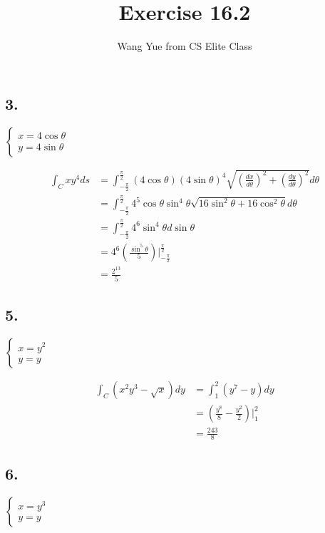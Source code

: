 \documentclass{article}
\begin{document}
  \title{Exercise 16.2}
  \author{Wang Yue from CS Elite Class}
  \maketitle

  \subsection*{3. }

  $\left\{ \begin{array}{ll}
    x = 4\cos \theta \\
    y = 4\sin \theta
  \end{array}\right.$

  $$\begin{aligned}
    \int_C xy^4 ds &= \int_{-\frac \pi 2}^{\frac \pi 2} (4\cos \theta)(4\sin \theta)^4 \sqrt{(\frac{dx}{d\theta})^2 + (\frac{dy}{d\theta})^2} d\theta \\
    &= \int_{-\frac \pi 2}^{\frac \pi 2} 4^5 \cos \theta \sin^4 \theta \sqrt{16\sin^2 \theta + 16\cos^2 \theta} d\theta  \\
    &= \int_{-\frac \pi 2}^{\frac \pi 2} 4^6 \sin^4 \theta d\sin \theta \\
    &= 4^6 (\frac{\sin^5 \theta}{5})\biggl|_{-\frac{\pi}{2}}^{\frac{\pi}{2}} \\
    &= \frac{2^{13}}{5}
  \end{aligned}$$

  \subsection*{5. }

  $\left\{ \begin{array}{ll}
    x = y^2 \\ y = y
  \end{array}\right.$

  $$\begin{aligned}
    \int_C (x^2y^3 - \sqrt x) dy &= \int_1^2 (y^7- y)dy \\
    &= (\frac{y^8}{8} - \frac{y^2}{2})\biggl|_1^2 \\
    &= \frac{243}{8}
  \end{aligned}$$

  \subsection*{6. }

  $\left\{ \begin{array}{ll}
    x = y^3 \\
    y = y
  \end{array}\right.$
\end{document}
